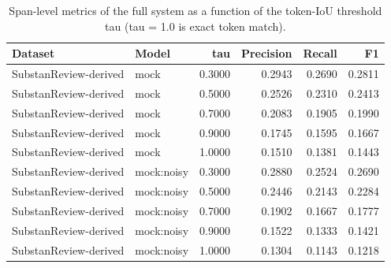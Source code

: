 \begin{table}
\caption{Span-level metrics of the full system as a function of the token-IoU threshold tau (tau = 1.0 is exact token match).}
\label{tab:table_tau_sensitivity}
\begin{tabular}{llrrrr}
\toprule
Dataset & Model & tau & Precision & Recall & F1 \\
\midrule
SubstanReview-derived & mock & 0.3000 & 0.2943 & 0.2690 & 0.2811 \\
SubstanReview-derived & mock & 0.5000 & 0.2526 & 0.2310 & 0.2413 \\
SubstanReview-derived & mock & 0.7000 & 0.2083 & 0.1905 & 0.1990 \\
SubstanReview-derived & mock & 0.9000 & 0.1745 & 0.1595 & 0.1667 \\
SubstanReview-derived & mock & 1.0000 & 0.1510 & 0.1381 & 0.1443 \\
SubstanReview-derived & mock:noisy & 0.3000 & 0.2880 & 0.2524 & 0.2690 \\
SubstanReview-derived & mock:noisy & 0.5000 & 0.2446 & 0.2143 & 0.2284 \\
SubstanReview-derived & mock:noisy & 0.7000 & 0.1902 & 0.1667 & 0.1777 \\
SubstanReview-derived & mock:noisy & 0.9000 & 0.1522 & 0.1333 & 0.1421 \\
SubstanReview-derived & mock:noisy & 1.0000 & 0.1304 & 0.1143 & 0.1218 \\
\bottomrule
\end{tabular}
\end{table}
